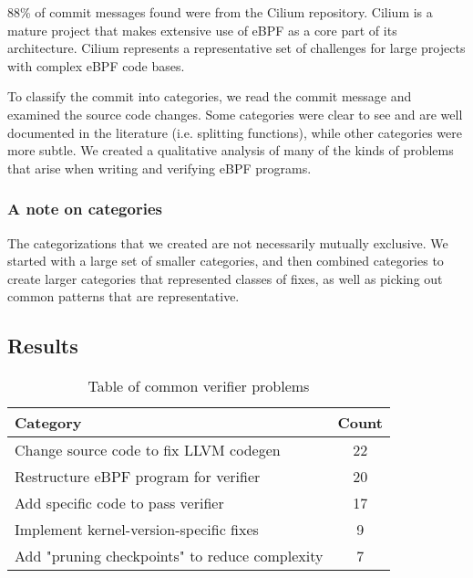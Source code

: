 88\% of commit messages found were from the Cilium repository.
Cilium is a mature project that makes extensive use of eBPF as a core part of its architecture.
Cilium represents a representative set of challenges for large projects with complex eBPF code bases.

To classify the commit into categories, we read the commit message and examined
    the source code changes.
Some categories were clear to see and are well documented in the literature (i.e. splitting functions), while other categories were more subtle.
We created a qualitative analysis of many of the kinds of problems that arise when writing and verifying eBPF programs.

\subsubsection{A note on categories}
The categorizations that we created are not necessarily mutually exclusive.
We started with a large set of smaller categories, and then combined categories to
    create larger categories that represented classes of fixes, as well as picking out 
    common patterns that are representative.
\subsection{Results}

\begin{table}[t]
    \small
    \centering
    \begin{tabular}{lc}%
        \toprule
        \textbf{Category} & \textbf{Count} \\
        \midrule
        Change source code to fix LLVM codegen & 22 \\          %
        Restructure eBPF program for verifier & 20 \\           %
        Add specific code to pass verifier & 17 \\              %
        Implement kernel-version-specific fixes & 9 \\          %
        Add "pruning checkpoints" to reduce complexity & 7 \\   %
        \bottomrule
    \end{tabular}
    \caption{Table of common verifier problems}
    \label{fig:commit-table}
\end{table}

